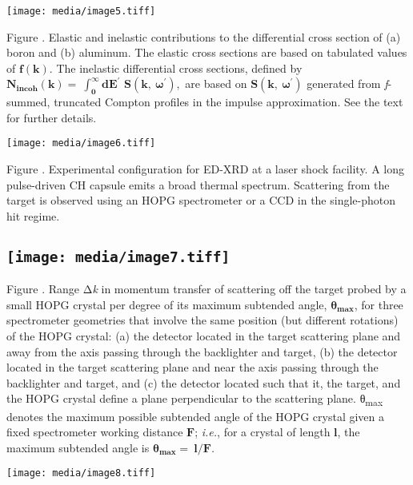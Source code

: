 \texttt{[image: media/image5.tiff]}

Figure . Elastic and inelastic contributions to the differential cross
section of (a) boron and (b) aluminum. The elastic cross sections are
based on tabulated values of \(\mathbf{f(k)}\). The inelastic
differential cross sections, defined by
\(\mathbf{N}_{\mathbf{\text{incoh}}}\left( \mathbf{k} \right)\mathbf{= \ }\int_{\mathbf{0}}^{\mathbf{\infty}}{\mathbf{d}\mathbf{E}^{\mathbf{'}}}\mathbf{\text{\ S}}\left( \mathbf{k,\ }\mathbf{\omega}^{\mathbf{'}} \right)\mathbf{,}\)
are based on
\(\mathbf{S}\left( \mathbf{k,\ }\mathbf{\omega}^{\mathbf{'}} \right)\)
generated from \emph{f}-summed, truncated Compton profiles in the
impulse approximation. See the text for further details.

\texttt{[image: media/image6.tiff]}

Figure . Experimental configuration for
ED-XRD at a laser shock facility. A long pulse-driven CH capsule emits a
broad thermal spectrum. Scattering from the target is observed using an
HOPG spectrometer or a CCD in the single-photon hit regime.

\subsection{\texorpdfstring{\protect\texttt{[image: media/image7.tiff]}}{}}\label{section-4}

Figure . Range Δ\emph{k} in momentum transfer of scattering off the
target probed by a small HOPG crystal per degree of its maximum
subtended angle, \(\mathbf{\theta}_{\mathbf{\max}}\), for three
spectrometer geometries that involve the same position (but different
rotations) of the HOPG crystal: (a) the detector located in the target
scattering plane and away from the axis passing through the backlighter
and target, (b) the detector located in the target scattering plane and
near the axis passing through the backlighter and target, and (c) the
detector located such that it, the target, and the HOPG crystal define a
plane perpendicular to the scattering plane. θ\textsubscript{max}
denotes the maximum possible subtended angle of the HOPG crystal given a
fixed spectrometer working distance \(\mathbf{F}\); \emph{i.e.}, for a
crystal of length \(\mathbf{l}\), the maximum subtended angle is
\(\mathbf{\theta}_{\mathbf{\max}}\mathbf{= \ l/F}\)\emph{.}


\texttt{[image: media/image8.tiff]}

